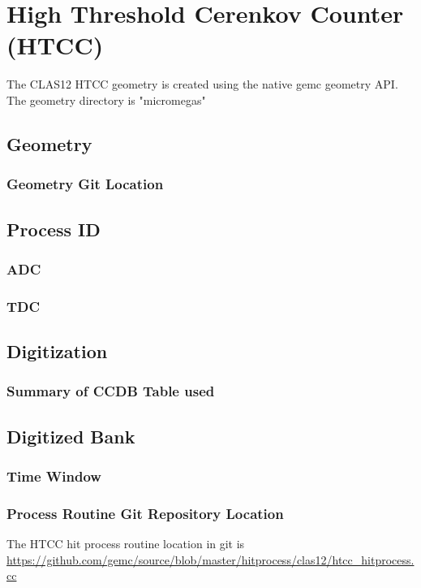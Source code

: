 \section{High Threshold Cerenkov Counter (HTCC)}

The CLAS12 HTCC geometry is created using the native gemc geometry API.
The geometry directory is "micromegas"


\subsection{Geometry}

\subsubsection{Geometry Git Location}

\subsection{Process ID}
\subsubsection{ADC}
\subsubsection{TDC}

\subsection{Digitization}


\subsubsection{Summary of CCDB Table used}

\subsection{Digitized Bank}

\subsubsection{Time Window}

\subsubsection{Process Routine Git Repository Location}


The HTCC hit process routine location in git is \url{https://github.com/gemc/source/blob/master/hitprocess/clas12/htcc_hitprocess.cc}

